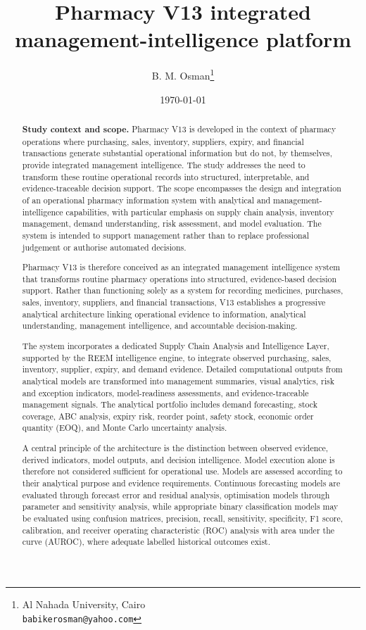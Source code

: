 \documentclass[12pt]{article}
\title{\textcolor{titleColor}{\textbf{\Huge Pharmacy V13 integrated  management-intelligence platform }}}
\author{B. M. Osman\thanks{Al Nahada University, Cairo \\ \texttt{babikerosman@yahoo.com}}}
\date{\today}
\begin{document}
\maketitle


\begin{abstract}

\textbf{Study context and scope.}
Pharmacy V13 is developed in the context of pharmacy operations where
purchasing, sales, inventory, suppliers, expiry, and financial transactions
generate substantial operational information but do not, by themselves,
provide integrated management intelligence. The study addresses the need to
transform these routine operational records into structured, interpretable,
and evidence-traceable decision support. The scope encompasses the design and
integration of an operational pharmacy information system with analytical and
management-intelligence capabilities, with particular emphasis on supply
chain analysis, inventory management, demand understanding, risk assessment,
and model evaluation. The system is intended to support management rather than
to replace professional judgement or authorise automated decisions.

Pharmacy V13 is therefore conceived as an integrated management intelligence
system that transforms routine pharmacy operations into structured,
evidence-based decision support. Rather than functioning solely as a system
for recording medicines, purchases, sales, inventory, suppliers, and financial
transactions, V13 establishes a progressive analytical architecture linking
operational evidence to information, analytical understanding, management
intelligence, and accountable decision-making.

The system incorporates a dedicated Supply Chain Analysis and Intelligence
Layer, supported by the REEM intelligence engine, to integrate observed
purchasing, sales, inventory, supplier, expiry, and demand evidence. Detailed
computational outputs from analytical models are transformed into management
summaries, visual analytics, risk and exception indicators, model-readiness
assessments, and evidence-traceable management signals. The analytical
portfolio includes demand forecasting, stock coverage, ABC analysis, expiry
risk, reorder point, safety stock, economic order quantity (EOQ), and Monte
Carlo uncertainty analysis.

A central principle of the architecture is the distinction between observed
evidence, derived indicators, model outputs, and decision intelligence. Model
execution alone is therefore not considered sufficient for operational use.
Models are assessed according to their analytical purpose and evidence
requirements. Continuous forecasting models are evaluated through forecast
error and residual analysis, optimisation models through parameter and
sensitivity analysis, while appropriate binary classification models may be
evaluated using confusion matrices, precision, recall, sensitivity,
specificity, F1 score, calibration, and receiver operating characteristic
(ROC) analysis with area under the curve (AUROC), where adequate labelled
historical outcomes exist.


\end{abstract}
\end{document}
